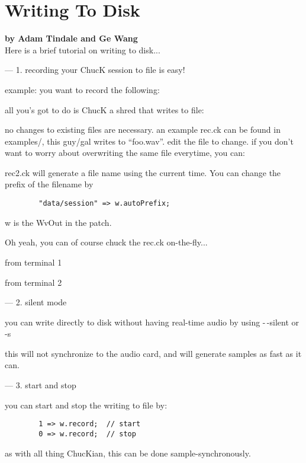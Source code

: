 \section{Writing To Disk}
\textbf{by Adam Tindale and Ge Wang}\\

Here is a brief tutorial on writing to disk...

---
1. recording your ChucK session to file is easy!

example:  you want to record the following:


all you's got to do is ChucK a shred that writes to file:


no changes to existing files are necessary.
an example rec.ck can be found in examples/, this
guy/gal writes to ``foo.wav''.  edit the file to change.
if you don't want to worry about overwriting the same
file everytime, you can:


rec2.ck will generate a file name using the current
time.  You can change the prefix of the filename by
\begin{verbatim}
        "data/session" => w.autoPrefix;
\end{verbatim}
w is the WvOut in the patch.

Oh yeah, you can of course chuck the rec.ck on-the-fly...

from terminal 1

from terminal 2


---
2. silent mode

you can write directly to disk without having real-time audio
by using -\,-silent or -s


this will not synchronize to the audio card, and will generate
samples as fast as it can.


---
3. start and stop

you can start and stop the writing to file by:
\begin{verbatim}
        1 => w.record;  // start
        0 => w.record;  // stop
\end{verbatim}
as with all thing ChucKian, this can be done
sample-synchronously.


